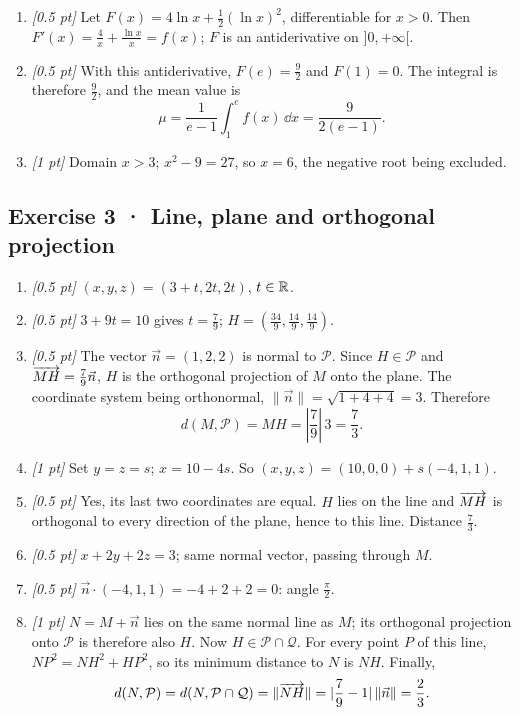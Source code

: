 \begin{enumerate}
\item \textit{[0.5 pt]} Let $F(x)=4\ln x+\frac12(\ln x)^2$, differentiable for $x>0$. Then $F'(x)=\frac{4}{x}+\frac{\ln x}{x}=f(x)$; $F$ is an antiderivative on $]0,+\infty[$.

\item \textit{[0.5 pt]} With this antiderivative, $F(e)=\frac{9}{2}$ and $F(1)=0$. The integral is therefore $\frac{9}{2}$, and the mean value is
\[\mu=\frac{1}{e-1}\int_1^e f(x)\,\dd x=\frac{9}{2(e-1)}.\]

\item \textit{[1 pt]} Domain $x>3$; $x^2-9=27$, so $x=6$, the negative root being excluded.

\end{enumerate}

\subsection*{Exercise 3 · Line, plane and orthogonal projection}\begin{enumerate}

\item \textit{[0.5 pt]} $(x,y,z)=(3+t,2t,2t)$, $t\in\mathbb R$.

\item \textit{[0.5 pt]} $3+9t=10$ gives $t=\frac{7}{9}$; $H=(\frac{34}{9},\frac{14}{9},\frac{14}{9})$.

\item \textit{[0.5 pt]} The vector $\vec n=(1,2,2)$ is normal to $\mathcal P$. Since $H\in\mathcal P$ and $\overrightarrow{MH}=\frac{7}{9}\vec n$, $H$ is the orthogonal projection of $M$ onto the plane. The coordinate system being orthonormal, $\|\vec n\|=\sqrt{1+4+4}=3$. Therefore
\[d(M,\mathcal P)=MH=|\frac{7}{9}|\,3=\frac{7}{3}.\]

\item \textit{[1 pt]} Set $y=z=s$; $x=10-4s$. So $(x,y,z)=(10,0,0)+s(-4,1,1)$.

\item \textit{[0.5 pt]} Yes, its last two coordinates are equal. $H$ lies on the line and $\overrightarrow{MH}$ is orthogonal to every direction of the plane, hence to this line. Distance $\frac{7}{3}$.

\item \textit{[0.5 pt]} $x+2y+2z=3$; same normal vector, passing through $M$.

\item \textit{[0.5 pt]} $\vec n\cdot(-4,1,1)=-4+2+2=0$: angle $\frac{\pi}{2}$.

\item \textit{[1 pt]} $N=M+\vec n$ lies on the same normal line as $M$; its orthogonal projection onto $\mathcal P$ is therefore also $H$. Now $H\in\mathcal P\cap\mathcal Q$. For every point $P$ of this line, $NP^2=NH^2+HP^2$, so its minimum distance to $N$ is $NH$. Finally,
\[d(N,\mathcal P)=d(N,\mathcal P\cap\mathcal Q)=\|\overrightarrow{NH}\|=|\frac{7}{9}-1|\,\|\vec n\|=\frac{2}{3}.\]

\end{enumerate}

